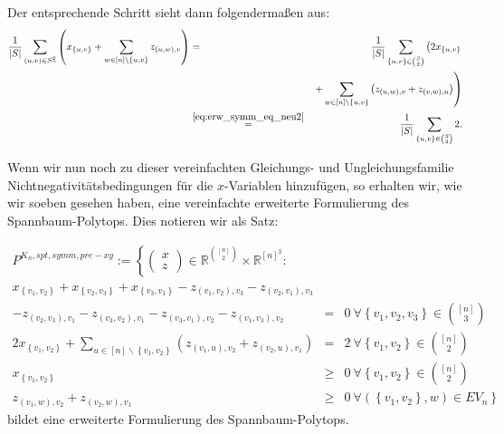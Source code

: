 \documentclass[10p,a4paper,BCOR = 12mm, DIV=15]{scrbook}
\begin{document}
\begin{itemize}
Der entsprechende Schritt sieht dann folgendermaßen aus:
\begin{eqnarray*}
\frac{1}{\left|S\right|} \sum_{\left(u, v\right) \in S^{\underline{2}}} \left( x_{\left\{u, v\right\}} + \sum_{w \in \left[n\right] \backslash \left\{u, v\right\}} z_{\left(u, w\right), v} 
\right)
& = & 
\frac{1}{\left|S\right|} \sum_{\left\{u, v\right\} \in {S \choose 2}} \left(2 x_{\left\{u, v\right\}}\right. \\
& & \left.+ \sum_{w \in \left[n\right] \backslash \left\{u, v\right\}} \left(z_{\left(u, w\right), v} + z_{\left(v, w\right), u}\right)\right) \\
& \stackrel{\eqref{eq:erw_symm_eq_neu2}}{=} &
\frac{1}{\left|S\right|} \sum_{\left\{u, v\right\} \in {S \choose 2}} 2.
\end{eqnarray*}
\end{itemize}

Wenn wir nun noch zu dieser vereinfachten Gleichungs- und Ungleichungsfamilie Nichtnegativitätsbedingungen für die $x$-Variablen hinzufügen, so erhalten wir, wie wir soeben gesehen haben, eine vereinfachte erweiterte Formulierung des Spannbaum-Polytops. Dies notieren wir als Satz:

\begin{Sa}
\label{sa:pre_Pxy}
\begin{eqnarray*}
P^{K_n, spt, symm, pre-xy} := \left\{
\left(\begin{array}{c}
x \\
z
\end{array}\right)\in\mathbb{R}^{[n]\choose 2}\times \mathbb{R}^{[n]^{\underline{3}}}: \nonumber\right. & & \\
x_{\left\{v_1, v_2\right\}} + x_{\left\{v_2, v_3\right\}} + x_{\left\{v_3, v_1\right\}} 
- z_{\left(v_1, v_2\right), v_3} - z_{\left(v_2, v_1\right), v_3} & & \nonumber \\
- z_{\left(v_2, v_3\right), v_1} - z_{\left(v_3, v_2\right), v_1} 
- z_{\left(v_3, v_1\right), v_2} - z_{\left(v_1, v_3\right), v_2}
& = & 0\ \forall \left\{v_1, v_2, v_3\right\}\in {\left[n\right] \choose 3} \\
2 x_{\left\{v_1, v_2\right\}} + \sum_{u\in[n]\backslash\left\{v_1, v_2\right\}} \left(z_{\left(v_1, u\right), v_2} + z_{\left(v_2, u\right), v_1} \right) & = & 2\ \forall \left\{v_1, v_2\right\}\in {[n] \choose 2} \\
x_{\left\{v_1, v_2\right\}} & \geq & 0 \ \forall \left\{v_1, v_2\right\}\in {[n] \choose 2} \\
z_{\left(v_1, w\right), v_2}+z_{\left(v_2, w\right), v_1} & \geq & 0 \left. \ \forall \left(\left\{v_1, v_2\right\}, w\right) \in EV_n \nonumber \right\}
\end{eqnarray*}
bildet eine erweiterte Formulierung des Spannbaum-Polytops.
\end{Sa}
\end{document}
